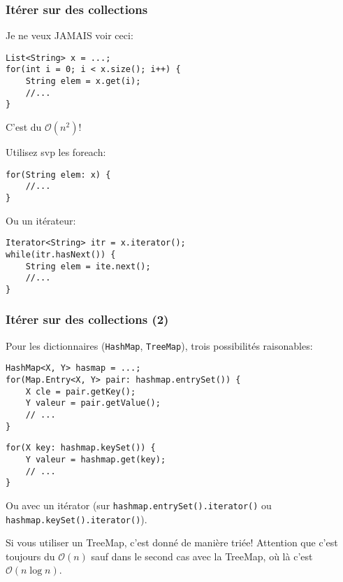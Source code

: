 \documentclass[8pt,aspectratio=169]{beamer}
\begin{document}
\begin{frame}[fragile]
\frametitle{Itérer sur des collections}
{\color{red} Je ne veux JAMAIS voir ceci:}
\begin{lstlisting}
List<String> x = ...;
for(int i = 0; i < x.size(); i++) {
	String elem = x.get(i);
	//...
}
\end{lstlisting}
{\color{red} C'est du $\mathcal{O}(n^2)$!}

{\color{blue} Utilisez svp les foreach:}
\begin{lstlisting}
for(String elem: x) {
	//...
}
\end{lstlisting}

{\color{blue} Ou un itérateur:}
\begin{lstlisting}
Iterator<String> itr = x.iterator();
while(itr.hasNext()) {
	String elem = ite.next();
	//...
}
\end{lstlisting}
\end{frame}

\begin{frame}[fragile]
\frametitle{Itérer sur des collections (2)}
Pour les dictionnaires (\texttt{HashMap}, \texttt{TreeMap}), trois possibilités raisonables:
\begin{lstlisting}
HashMap<X, Y> hasmap = ...;
for(Map.Entry<X, Y> pair: hashmap.entrySet()) {
	X cle = pair.getKey();
	Y valeur = pair.getValue();
	// ...
}
\end{lstlisting}

\begin{lstlisting}
for(X key: hashmap.keySet()) {
	Y valeur = hashmap.get(key);
	// ...
}
\end{lstlisting}

Ou avec un itérator (sur \texttt{hashmap.entrySet().iterator()} ou \texttt{hashmap.keySet().iterator()}).

Si vous utiliser un TreeMap, c'est donné de manière triée! Attention que c'est toujours du $\mathcal{O}(n)$ sauf dans le second cas avec la TreeMap, où là c'est $\mathcal{O}(n \log n)$.
\end{frame}
\end{document}

